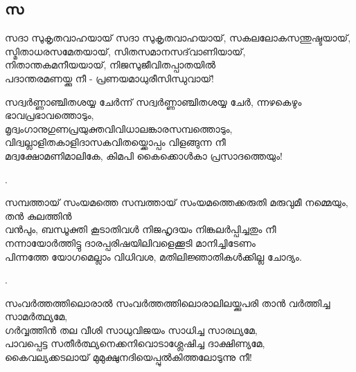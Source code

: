 \subsection{സ}

\begin{enumerate}
\begin{slokam}{\VPv}{\UN}{സദാ സുകൃതവാഹയായ്}
സദാ സുകൃതവാഹയായ്,   സകലലോകസന്തുഷ്ടയായ്,\\
സ്മിതാധരസമേതയായ്,  സിതസമാനസദ്‌വാണിയായ്,\\
നിതാന്തകമനീയയായ്,    നിജസുജീവിതപ്പാതയിൽ\\
പദാന്തരമണയ്ക്കു നീ -  പ്രണയമാധുരീസിന്ധുവായ്!
\end{slokam}


\begin{slokam}{\VSv}{\VNM}{സദ്വർണ്ണാഞ്ചിതശയ്യ ചേർന്ന്}
 സദ്വർണ്ണാഞ്ചിതശയ്യ ചേർ, ന്നഴകെഴും ഭാവപ്രഭാവത്തൊടും,\\
മൃദ്വംഗാനുഗുണപ്രയുക്തവിവിധാലങ്കാരസമ്പത്തൊടും,\\
വിദ്വല്ലാളിതകാളിദാസകവിതയ്ക്കൊപ്പം വിളങ്ങുന്ന നീ\\
മദ്വക്ഷോമണിമാലികേ, കിമപി കൈക്കൊള്‍കാ പ്രസാദത്തെയും!
\end{slokam}


.

\begin{slokam}{\VSr}{\ARRV}{സമ്പത്തായ്‌ സംയമത്തെ}
 സമ്പത്തായ്‌ സംയമത്തെക്കരുതി മരുവുമീ നമ്മെയും, തൻ കുലത്തിൻ\\
വൻപും, ബന്ധൂക്തി കൂടാതിവള്‍ നിജഹൃദയം നിങ്കലർപ്പിച്ചതും നീ\\
നന്നായോർത്തിട്ടു ദാരപ്പരിഷയിലിവളെക്കൂടി മാനിച്ചിടേണം\\
പിന്നത്തേ യോഗമെല്ലാം വിധിവശ, മതിലിജ്ഞാതികള്‍ക്കില്ല ചോദ്യം.
\end{slokam}


.

\begin{slokam}{\VSv}{\YK}{സം‌വർത്തത്തിലൊരാൽ}
സം‌വർത്തത്തിലൊരാലിലയ്ക്കുപരി താൻ വർത്തിച്ച സാമർത്ഥ്യമേ,\\
ഗർവ്വത്തിൻ തല വീശി സാധുവിജയം സാധിച്ച സാരഥ്യമേ, \\
പാവപ്പെട്ട സതീർത്ഥ്യനെക്കനിവൊടാശ്ലേഷിച്ച ദാക്ഷിണ്യമേ,  \\
കൈവല്യക്കടലായ് മുമുക്ഷുനദിയെപ്പുൽകിത്തലോടുന്നു നീ!
\end{slokam}


\end{enumerate}
